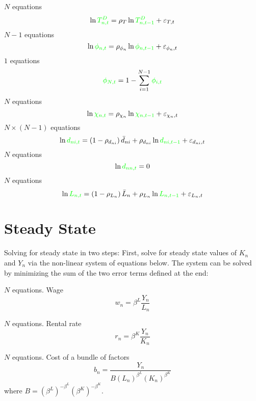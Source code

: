 \documentclass[11pt]{article}
\newcommand{\st}[1]{{\color{green}{#1}}}
\begin{document}
\noindent $N$ equations
\begin{equation}
\ln \st{T^D_{n,t}} = \rho_T \ln  \st{T^D_{n,t-1}} + \varepsilon_{T,t}    
\end{equation}
\noindent $N-1$ equations
\begin{equation}
\ln \st{\phi_{n,t}} = \rho_{\phi_n} \ln  \st{\phi_{n,t-1}} + \varepsilon_{\phi_n,t}  
\end{equation}
\noindent $1$ equations
\begin{equation}
\st{\phi_{N,t}} = 1 - \sum_{i=1}^{N-1} \st{\phi_{i,t}}
\end{equation}
\noindent $N$ equations
\begin{equation}
\ln \st{\chi_{n,t}} = \rho_{\chi_n} \ln  \st{\chi_{n,t-1}} + \varepsilon_{\chi_n,t}    
\end{equation}
\noindent $N \times (N-1)$ equations
\begin{equation}
\ln \st{d_{ni,t}} = \left(1 - \rho_{d_{ni}} \right) \bar{d}_{ni} + \rho_{d_{ni}} \ln  \st{d_{ni,t-1}} + \varepsilon_{d_{ni},t}    
\end{equation}
\noindent $N$ equations
\begin{equation}
\ln \st{d_{nn,t}} = 0  
\end{equation}
\noindent $N$ equations
\begin{equation}
\ln \st{L_{n,t}} = \left(1 - \rho_{L_{n}} \right) \bar{L}_{n} + \rho_{L_{n}} \ln  \st{L_{n,t-1}} + \varepsilon_{L_{n},t}    
\end{equation}


\section{Steady State}

Solving for steady state in two steps: First, solve for steady state values of $K_n$ and $Y_n$ via the non-linear system of equations below. The system can be solved by minimizing the sum of the two error terms defined at the end:

\noindent $N$ equations. Wage
\begin{equation}
w_{n} = \beta^L \frac{Y_{n}}{L_{n}}
\end{equation}

\noindent $N$ equations. Rental rate
\begin{equation}
 r_{n} = \beta^K \frac{Y_{n}}{K_{n}}
\end{equation}

\noindent $N$ equations. Cost of a bundle of factors
\begin{equation}
b_{n}=\frac{Y_{n}}{B\left(L_{n}\right)^{\beta^{L}}\left(K_{n}\right)^{\beta^{K}}}
\end{equation}
where $B=\left(\beta^{L}\right)^{-\beta^{L}}\left(\beta^{K}\right)^{-\beta^{K}}$.
\end{document}
